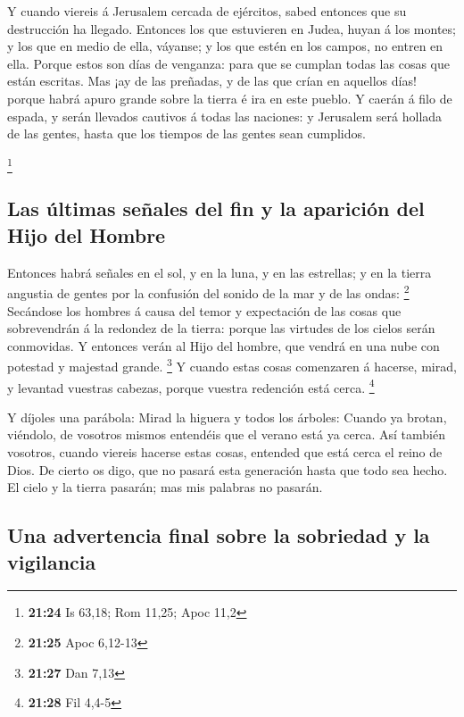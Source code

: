  Y cuando viereis á Jerusalem cercada de ejércitos, sabed
entonces que su destrucción ha llegado.  Entonces los que
estuvieren en Judea, huyan á los montes; y los que en medio de ella,
váyanse; y los que estén en los campos, no entren en ella. 
Porque estos son días de venganza: para que se cumplan todas las cosas
que están escritas.  Mas ¡ay de las preñadas, y de las que
crían en aquellos días! porque habrá apuro grande sobre la tierra é ira
en este pueblo.  Y caerán á filo de espada, y serán
llevados cautivos á todas las naciones: y Jerusalem será hollada de las
gentes, hasta que los tiempos de las gentes sean cumplidos.

\footnote{\textbf{21:24} Is 63,18; Rom 11,25; Apoc 11,2}

\hypertarget{las-uxfaltimas-seuxf1ales-del-fin-y-la-apariciuxf3n-del-hijo-del-hombre}{%
\subsection{Las últimas señales del fin y la aparición del Hijo del
Hombre}\label{las-uxfaltimas-seuxf1ales-del-fin-y-la-apariciuxf3n-del-hijo-del-hombre}}

 Entonces habrá señales en el sol, y en la luna, y en las
estrellas; y en la tierra angustia de gentes por la confusión del sonido
de la mar y de las ondas: \footnote{\textbf{21:25} Apoc 6,12-13}
 Secándose los hombres á causa del temor y expectación de
las cosas que sobrevendrán á la redondez de la tierra: porque las
virtudes de los cielos serán conmovidas.  Y entonces verán
al Hijo del hombre, que vendrá en una nube con potestad y majestad
grande. \footnote{\textbf{21:27} Dan 7,13}  Y cuando estas
cosas comenzaren á hacerse, mirad, y levantad vuestras cabezas, porque
vuestra redención está cerca. \footnote{\textbf{21:28} Fil 4,4-5}

 Y díjoles una parábola: Mirad la higuera y todos los
árboles:  Cuando ya brotan, viéndolo, de vosotros mismos
entendéis que el verano está ya cerca.  Así también
vosotros, cuando viereis hacerse estas cosas, entended que está cerca el
reino de Dios.  De cierto os digo, que no pasará esta
generación hasta que todo sea hecho.  El cielo y la tierra
pasarán; mas mis palabras no pasarán.

\hypertarget{una-advertencia-final-sobre-la-sobriedad-y-la-vigilancia}{%
\subsection{Una advertencia final sobre la sobriedad y la
vigilancia}\label{una-advertencia-final-sobre-la-sobriedad-y-la-vigilancia}}

